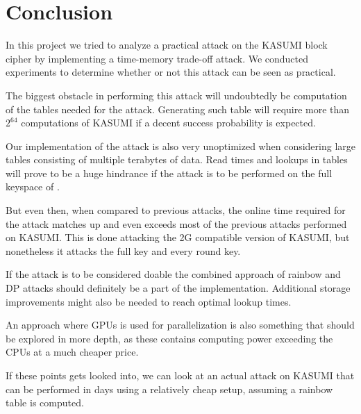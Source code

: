 \chapter{Conclusion}
\label{ch:concl}

In this project we tried to analyze a practical attack on the KASUMI
block cipher by implementing a time-memory trade-off attack. We
conducted experiments to determine whether or not this attack can be
seen as practical. 

The biggest obstacle in performing this attack will undoubtedly be
computation of the tables needed for the attack. Generating such table
will require more than $2^{64}$ computations of KASUMI if a decent
success probability is expected.

Our implementation of the attack is also very unoptimized when
considering large tables consisting of multiple terabytes of
data. Read times and lookups in tables will prove to be a huge
hindrance if the attack is to be performed on the full keyspace of
.

But even then, when compared to previous attacks, the online time
required for the attack matches up and even exceeds most of the
previous attacks performed on KASUMI. This is done attacking the 2G
compatible version of KASUMI, but nonetheless it attacks the full key
and every round key.

If the attack is to be considered doable the combined approach of 
rainbow and DP attacks should definitely be a part of the
implementation. Additional storage improvements might also be needed
to reach optimal lookup times.

An approach where GPUs is used for parallelization is also something
that should be explored in more depth, as these contains computing
power exceeding the CPUs at a much cheaper price.

If these points gets looked into, we can look at an actual attack on
KASUMI that can be performed in days using a relatively cheap
setup, assuming a rainbow table is computed.


